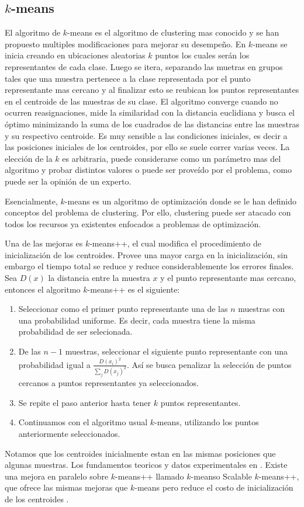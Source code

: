 \documentclass[10pt,a4paper]{article}
\begin{document}
\subsection{$k$-means}
El algoritmo de $k$-means es el algoritmo de clustering mas conocido y se han propuesto multiples modificaciones para mejorar su desempeño. %
En $k$-means se inicia creando en ubicaciones aleatorias $k$ puntos los cuales serán los representantes de cada clase. Luego se itera, separando las muetras en grupos tales que una muestra pertenece a la clase representada por el punto representante mas cercano y al finalizar esto se reubican los puntos representantes en el centroide de las muestras de su clase. El algoritmo converge cuando no ocurren reasignaciones, mide la similaridad con la distancia euclidiana y busca el óptimo minimizando la suma de los cuadrados de las distancias entre las muestras y su respectivo centroide. Es muy sensible a las condiciones iniciales, es decir a las posiciones iniciales de los centroides, por ello se suele correr varias veces. La elección de la $k$ es arbitraria, puede considerarse como un parámetro mas del algoritmo y probar distintos valores o puede ser proveído por el problema, como puede ser la opinión de un experto.

Esencialmente, $k$-means es un algoritmo de optimización donde se le han definido conceptos del problema de clustering. Por ello, clustering puede ser atacado con todos los recursos ya existentes enfocados a problemas de optimización.

Una de las mejoras es $k$-means++, el cual modifica el procedimiento de inicialización de los centroides. Provee una mayor carga en la inicialización, sin embargo el tiempo total se reduce y reduce considerablemente los errores finales. Sea $D(x)$ la distancia entre la muestra $x$ y el punto representante mas cercano, entonces el algoritmo $k$-means++ es el siguiente:
\begin{enumerate}
\item Seleccionar como el primer punto representante una de las $n$ muestras con una probabilidad uniforme. Es decir, cada muestra tiene la misma probabilidad de ser selecionada.
\item De las $n-1$ muestras, seleccionar el siguiente punto representante con una probabilidad igual a $\frac{D(x_i)^2}{\sum_j D(x_j)^2}$. Así se busca penalizar la selección de puntos cercanos a puntos representantes ya seleccionados.
\item Se repite el paso anterior hasta tener $k$ puntos representantes.
\item Continuamos con el algoritmo usual $k$-means, utilizando los puntos anteriormente seleccionados.
\end{enumerate}
Notamos que los centroides inicialmente estan en las mismas posiciones que algunas muestras. Los fundamentos teoricos y datos experimentales en \cite{arthur2007k}. Existe una mejora en paralelo sobre $k$-means++ llamado $k$-means\textbar\textbar  o Scalable $k$-means++, que ofrece las mismas mejoras que $k$-means pero reduce el costo de inicialización de los centroides \cite{bahmani2012scalable}.
\end{document}
